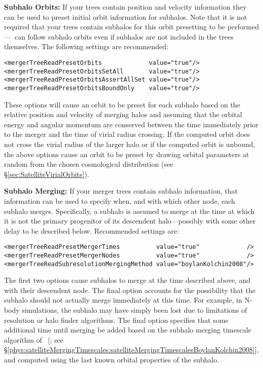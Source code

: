 {\bf Subhalo Orbits:} If your trees contain position and velocity information they can be used to preset initial orbit information for subhalos. Note that it is not required that your trees contain subhalos for this orbit presetting to be performed---\glc\ can follow subhalo orbits even if subhalos are not included in the trees themselves. The following settings are recommended:
\begin{verbatim}
<mergerTreeReadPresetOrbits             value="true"/>
<mergerTreeReadPresetOrbitsSetAll       value="true"/>
<mergerTreeReadPresetOrbitsAssertAllSet value="true"/>
<mergerTreeReadPresetOrbitsBoundOnly    value="true"/>
\end{verbatim}
These options will cause an orbit to be preset for each subhalo based on the relative position and velocity of merging halos and assuming that the orbital energy and angular momentum are conserved between the time immediately prior to the merger and the time of virial radius crossing. If the computed orbit does not cross the virial radius of the larger halo or if the computed orbit is unbound, the above options cause an orbit to be preset by drawing orbital parameters at random from the chosen cosmological distribution (see \S\ref{sec:SatelliteVirialOrbits}).

{\bf Subhalo Merging:} If your merger trees contain subhalo information, that information can be used to specify when, and with which other node, each subhalo merges. Specifically, a subhalo is assumed to merge at the time at which it is not the primary progenitor of its descendent halo---possibly with some other delay to be described below. Recommended settings are:
\begin{verbatim}
<mergerTreeReadPresetMergerTimes          value="true"             />
<mergerTreeReadPresetMergerNodes          value="true"             />
<mergerTreeReadSubresolutionMergingMethod value="boylanKolchin2008"/>
\end{verbatim}
The first two options cause subhalos to merge at the time described above, and with their descendent node. The final option accounts for the possibility that the subhalo should not actually merge immediately at this time. For example, in N-body simulations, the subhalo may have simply been lost due to limitations of resolution or halo finder algorithms. The final option specifies that some additional time until merging be added based on the subhalo merging timescale algorithm of \citeauthor{boylan-kolchin_dynamical_2008}~[\citeyear{boylan-kolchin_dynamical_2008}; see \S\ref{phys:satelliteMergingTimescales:satelliteMergingTimescalesBoylanKolchin2008}], and computed using the last known orbital properties of the subhalo.

